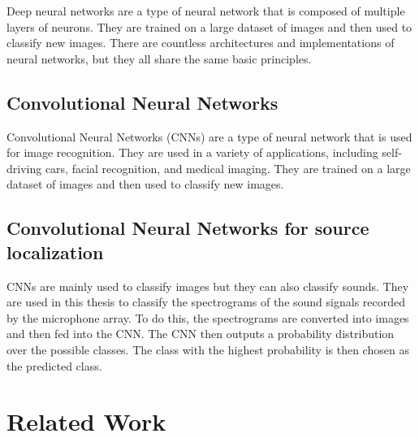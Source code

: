 Deep neural networks are a type of neural network that is composed of multiple layers of neurons.
They are trained on a large dataset of images and then used to classify new images. There are countless architectures \cite{LIU201711} and implementations of neural networks, but they all share the same basic principles.



\subsection{Convolutional Neural Networks}

Convolutional Neural Networks (CNNs) are a type of neural network that is used for image recognition. They are used in a variety of applications, including self-driving cars, facial recognition, and medical imaging. They are trained on a large dataset of images and then used to classify new images. 


\subsection{Convolutional Neural Networks for source localization}

CNNs are mainly used to classify images but they can also classify sounds. They are used in this thesis to classify the spectrograms of the sound signals recorded by the microphone array. To do this, the spectrograms are converted into images and then fed into the CNN. The CNN then outputs a probability distribution over the possible classes. The class with the highest probability is then chosen as the predicted class.

\section{Related Work}

\subsection{}

